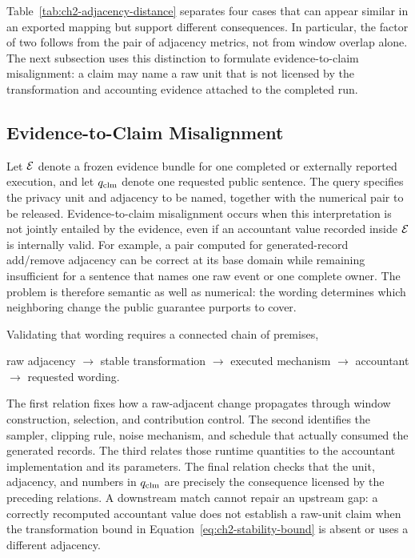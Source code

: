 Table~\ref{tab:ch2-adjacency-distance} separates four cases that can appear
similar in an exported mapping but support different consequences.  In particular,
the factor of two follows from the pair of adjacency metrics, not from window
overlap alone.  The next subsection uses this distinction to formulate
evidence-to-claim misalignment: a claim may name a raw unit that is not licensed by
the transformation and accounting evidence attached to the completed run.

\subsection{Evidence-to-Claim Misalignment}
\label{subsec:evidence-to-claim-misalignment}

Let \(\mathcal{E}\) denote a frozen evidence bundle for one completed or
externally reported execution, and let \(q_{\mathrm{clm}}\) denote one requested public
sentence.  The query specifies the privacy unit and adjacency to be named, together
with the numerical pair to be released.  Evidence-to-claim misalignment occurs
when this interpretation is not jointly entailed by the evidence, even if an
accountant value recorded inside \(\mathcal{E}\) is internally valid.  For
example, a pair computed for generated-record add/remove adjacency can be correct
at its base domain while remaining insufficient for a sentence that names one raw
event or one complete owner.  The problem is therefore semantic as well as
numerical: the wording determines which neighboring change the public guarantee
purports to cover.

Validating that wording requires a connected chain of premises,

\begin{center}
    raw adjacency \(\longrightarrow\) stable transformation
    \(\longrightarrow\) executed mechanism
    \(\longrightarrow\) accountant
    \(\longrightarrow\) requested wording.
\end{center}

The first relation fixes how a raw-adjacent change propagates through window
construction, selection, and contribution control.  The second identifies the
sampler, clipping rule, noise mechanism, and schedule that actually consumed the
generated records.  The third relates those runtime quantities to the accountant
implementation and its parameters.  The final relation checks that the unit,
adjacency, and numbers in \(q_{\mathrm{clm}}\) are precisely the consequence licensed
by the preceding relations.  A downstream match cannot repair an upstream gap:
a correctly recomputed accountant value does not establish a raw-unit claim when
the transformation bound in Equation~\eqref{eq:ch2-stability-bound} is absent or
uses a different adjacency.

